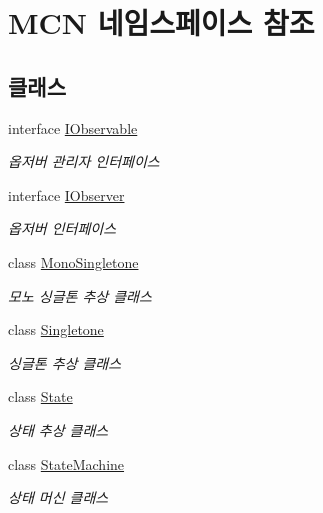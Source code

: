 \hypertarget{namespace_m_c_n}{}\section{M\+CN 네임스페이스 참조}
\label{namespace_m_c_n}
\subsection*{클래스}
\begin{DoxyCompactItemize}
\item 
interface \hyperlink{interface_m_c_n_1_1_i_observable}{I\+Observable}
\begin{DoxyCompactList}\small\item\em 옵저버 관리자 인터페이스 \end{DoxyCompactList}\item 
interface \hyperlink{interface_m_c_n_1_1_i_observer}{I\+Observer}
\begin{DoxyCompactList}\small\item\em 옵저버 인터페이스 \end{DoxyCompactList}\item 
class \hyperlink{class_m_c_n_1_1_mono_singletone}{Mono\+Singletone}
\begin{DoxyCompactList}\small\item\em 모노 싱글톤 추상 클래스 \end{DoxyCompactList}\item 
class \hyperlink{class_m_c_n_1_1_singletone}{Singletone}
\begin{DoxyCompactList}\small\item\em 싱글톤 추상 클래스 \end{DoxyCompactList}\item 
class \hyperlink{class_m_c_n_1_1_state}{State}
\begin{DoxyCompactList}\small\item\em 상태 추상 클래스 \end{DoxyCompactList}\item 
class \hyperlink{class_m_c_n_1_1_state_machine}{State\+Machine}
\begin{DoxyCompactList}\small\item\em 상태 머신 클래스 \end{DoxyCompactList}\end{DoxyCompactItemize}
